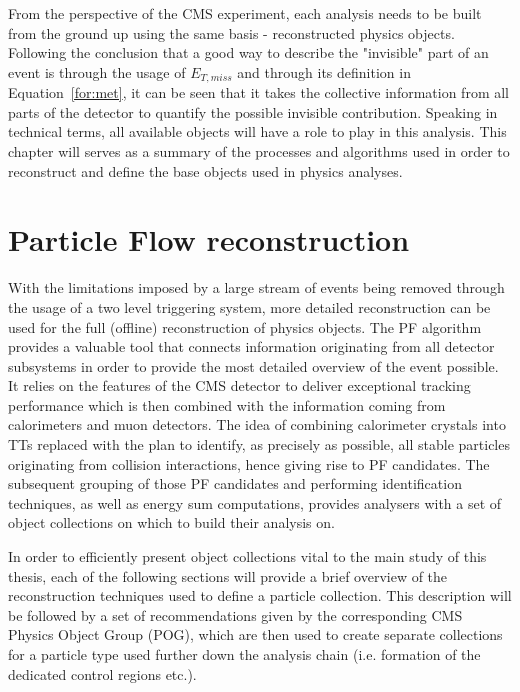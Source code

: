 \hspace{10pt} From the perspective of the CMS experiment, each analysis needs to be built from the ground up using the same basis - reconstructed physics objects. Following the conclusion that a good way to describe the "invisible" part of an event is through the usage of $E_{T,miss}$ and through its definition in Equation~\ref{for:met}, it can be seen that it takes the collective information from all parts of the detector to quantify the possible invisible contribution. Speaking in technical terms, all available objects will have a role to play in this analysis. This chapter will serves as a summary of the processes and algorithms used in order to reconstruct and define the base objects used in physics analyses.%

\section{Particle Flow reconstruction}
\label{sec:particle_flow}
\hspace{10pt} With the limitations imposed by a large stream of events being removed through the usage of a two level triggering system, more detailed reconstruction can be used for the full (offline) reconstruction of physics objects. The PF algorithm~\cite{Particle_flow,CMS-PAS-PFT-09-001,PF:Florian} provides a valuable tool that connects information originating from all detector subsystems in order to provide the most detailed overview of the event possible. It relies on the features of the CMS detector to deliver exceptional tracking performance which is then combined with the information coming from calorimeters and muon detectors. The idea of combining calorimeter crystals into TTs replaced with the plan to identify, as precisely as possible, all stable particles originating from collision interactions, hence giving rise to PF candidates. The subsequent grouping of those PF candidates and performing identification techniques, as well as energy sum computations, provides analysers with a set of object collections on which to build their analysis on.


\hspace{10pt} In order to efficiently present object collections vital to the main study of this thesis, each of the following sections will provide a brief overview of the reconstruction techniques used to define a particle collection. This description will be followed by a set of recommendations given by the corresponding CMS Physics Object Group (POG), which are then used to create separate collections for a particle type used further down the analysis chain (i.e. formation of the dedicated control regions etc.).


